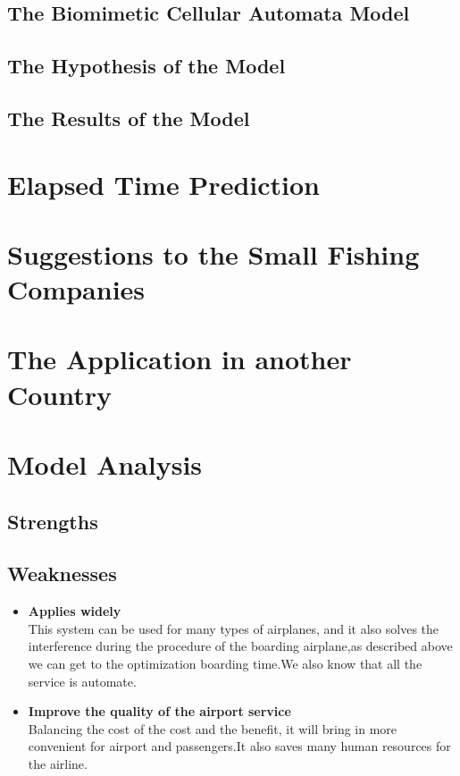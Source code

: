 \documentclass{mcmthesis}
\begin{document}
\subsection{The Biomimetic Cellular Automata Model}
\subsection{The Hypothesis of the Model}
\subsection{The Results of the Model}

\section{Elapsed Time Prediction}


\section{Suggestions to the Small Fishing Companies}


\section{The Application in another Country}

\section{Model Analysis}
\subsection{Strengths}

\subsection{Weaknesses}


\begin{itemize}
\item \textbf{Applies widely}\\
This  system can be used for many types of airplanes, and it also
solves the interference during  the procedure of the boarding
airplane,as described above we can get to the  optimization
boarding time.We also know that all the service is automate.

\item \textbf{Improve the quality of the airport service}\\
Balancing the cost of the cost and the benefit, it will bring in
more convenient  for airport and passengers.It also saves many
human resources for the airline.
\end{itemize}
\end{document}
